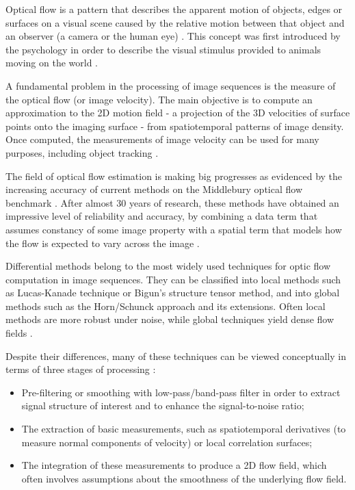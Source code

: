 \documentclass[msc, a4paper, classic, en]{ufbathesis}
\begin{document}
Optical flow is a pattern that describes the apparent motion of objects, edges or surfaces on a visual scene caused by the relative motion between that object and an observer (a camera or the human eye) \cite{burton1978thinking}. This concept was first introduced by the psychology in order to describe the visual stimulus provided to animals moving on the world \cite{gibson1950perception}.

A fundamental problem in the processing of image sequences is the measure of the optical flow (or image velocity). The main objective is to compute an approximation to the 2D motion field - a projection of the 3D velocities of surface points onto the imaging surface - from spatiotemporal patterns of image density. Once computed, the measurements of image velocity can be used for many purposes, including object tracking \cite{opticalflow}.

The field of optical flow estimation is making big progresses as evidenced by the increasing accuracy of current methods on the Middlebury optical flow benchmark \cite{Scharstein:2002:TED:598429.598475}. After almost 30 years of research, these methods have obtained an impressive level of reliability and accuracy, by combining a data term that assumes constancy of some image property with a spatial term that models how the flow is expected to vary across the image \cite{opticalflow14}.

Differential methods belong to the most widely used techniques for optic flow computation in image sequences. They can be classified into local methods such as Lucas-Kanade technique or Bigun's structure tensor method, and into global methods such as the Horn/Schunck approach and its extensions. Often local methods are more robust under noise, while global techniques yield dense flow fields \cite{lkhs}.

Despite their differences, many of these techniques can be viewed conceptually in terms of three stages of processing \cite{opticalflow}:

\begin{itemize}
  \item Pre-filtering or smoothing with low-pass/band-pass filter in order to extract signal structure of interest and to enhance the signal-to-noise ratio;
  \item The extraction of basic measurements, such as spatiotemporal derivatives (to measure normal components of velocity) or local correlation surfaces;
  \item The integration of these measurements to produce a 2D flow field, which often involves assumptions about the smoothness of the underlying flow field.
\end{itemize}
\end{document}
